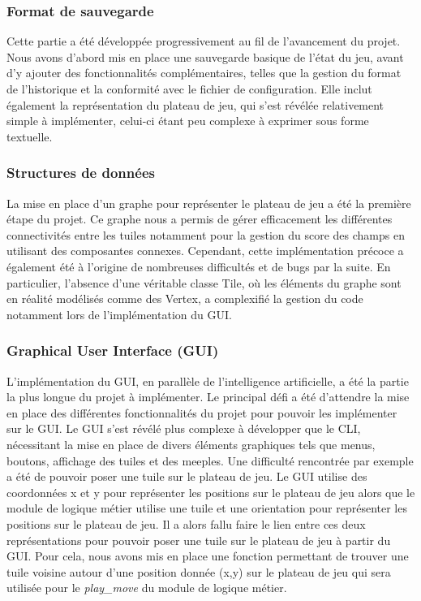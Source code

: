 \documentclass[11pt]{article}
\begin{document}
\subsubsection{Format de sauvegarde}

Cette partie a été développée progressivement au fil de l’avancement du projet. 
Nous avons d’abord mis en place une sauvegarde basique de l’état du jeu, avant d’y ajouter des fonctionnalités complémentaires, telles que la gestion du format de l’historique et la conformité avec le fichier de configuration.
Elle inclut également la représentation du plateau de jeu, qui s’est révélée relativement simple à implémenter, celui-ci étant peu complexe à exprimer sous forme textuelle.


\subsubsection{Structures de données}

La mise en place d'un graphe pour représenter le plateau de jeu a été la première étape du projet.
Ce graphe nous a permis de gérer efficacement les différentes connectivités entre les tuiles notamment pour la gestion du score des champs en utilisant des composantes connexes.
Cependant, cette implémentation précoce a également été à l’origine de nombreuses difficultés et de bugs par la suite. En particulier, l’absence d’une véritable classe Tile, où les éléments du graphe sont en réalité modélisés comme des Vertex, a complexifié la gestion du code notamment lors de l’implémentation du GUI.


\subsubsection{Graphical User Interface (GUI)}

L'implémentation du GUI, en parallèle de l'intelligence artificielle, a été la partie la plus longue du projet à implémenter. 
Le principal défi a été d'attendre la mise en place des différentes fonctionnalités du projet pour pouvoir les implémenter sur le GUI.
Le GUI s’est révélé plus complexe à développer que le CLI, nécessitant la mise en place de divers éléments graphiques tels que menus, boutons, affichage des tuiles et des meeples.
Une difficulté rencontrée par exemple a été de pouvoir poser une tuile sur le plateau de jeu.
Le GUI utilise des coordonnées x et y pour représenter les positions sur le plateau de jeu alors que le module de logique métier utilise une tuile et une orientation pour représenter les positions sur le plateau de jeu.
Il a alors fallu faire le lien entre ces deux représentations pour pouvoir poser une tuile sur le plateau de jeu à partir du GUI.
Pour cela, nous avons mis en place une fonction permettant de trouver une tuile voisine autour d'une position donnée (x,y) sur le plateau de jeu qui sera utilisée pour le \textit{play\_move} du module de logique métier.
\end{document}
